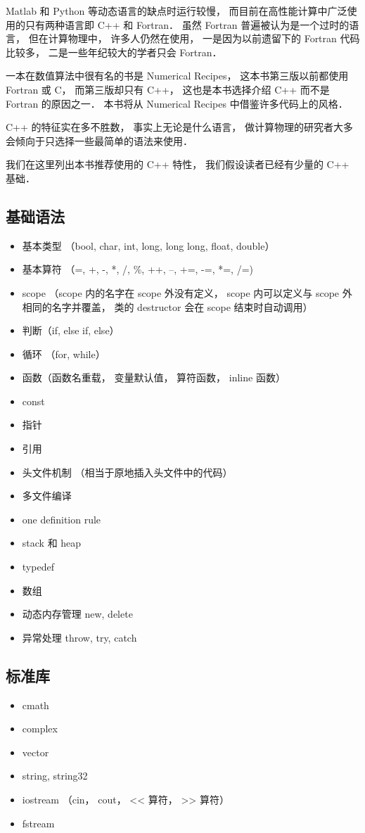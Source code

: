 
Matlab 和 Python 等动态语言的缺点时运行较慢， 而目前在高性能计算中广泛使用的只有两种语言即 C++ 和 Fortran． 虽然 Fortran 普遍被认为是一个过时的语言， 但在计算物理中， 许多人仍然在使用， 一是因为以前遗留下的 Fortran 代码比较多， 二是一些年纪较大的学者只会 Fortran．

一本在数值算法中很有名的书是 Numerical Recipes， 这本书第三版以前都使用 Fortran 或 C， 而第三版却只有 C++， 这也是本书选择介绍 C++ 而不是 Fortran 的原因之一． 本书将从 Numerical Recipes 中借鉴许多代码上的风格．

C++ 的特征实在多不胜数， 事实上无论是什么语言， 做计算物理的研究者大多会倾向于只选择一些最简单的语法来使用．

我们在这里列出本书推荐使用的 C++ 特性， 我们假设读者已经有少量的 C++ 基础．

\subsection{基础语法}
\begin{itemize}
\item 基本类型 （bool, char, int, long, long long, float, double）
\item 基本算符 （=, +, -, *, /, \%, ++, --, +=, -=, *=, /=)
\item scope （scope 内的名字在 scope 外没有定义， scope 内可以定义与 scope 外相同的名字并覆盖， 类的 destructor 会在 scope 结束时自动调用）
\item 判断（if, else if, else）
\item 循环 （for, while）
\item 函数（函数名重载， 变量默认值， 算符函数， inline 函数）
\item const
\item 指针
\item 引用
\item 头文件机制 （相当于原地插入头文件中的代码）
\item 多文件编译
\item one definition rule
\item stack 和 heap
\item typedef
\item 数组
\item 动态内存管理 new, delete
\item 异常处理 throw, try, catch
\end{itemize}

\subsection{标准库}
\begin{itemize}
\item cmath
\item complex
\item vector
\item string, string32
\item iostream （cin， cout， << 算符， >> 算符）
\item fstream
\end{itemize}

